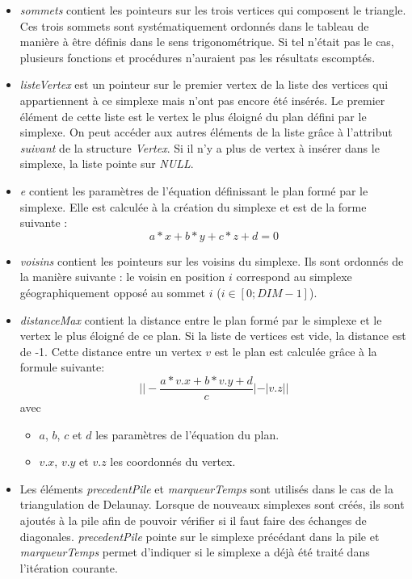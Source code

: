\documentclass{article}
\begin{document}
    \begin{itemize}
    \item \textit{sommets} contient les pointeurs sur les trois vertices qui composent le triangle. Ces trois sommets sont systématiquement ordonnés dans le tableau de manière à être définis dans le sens trigonométrique. Si tel n'était pas le cas, plusieurs fonctions et procédures n'auraient pas les résultats escomptés.
    \item \textit{listeVertex} est un pointeur sur le premier vertex de la liste des vertices qui appartiennent à ce simplexe mais n'ont pas encore été insérés. Le premier élément de cette liste est le vertex le plus éloigné du plan défini par le simplexe. On peut accéder aux autres éléments de la liste grâce à l'attribut \textit{suivant} de la structure \textit{Vertex}. Si il n'y a plus de vertex à insérer dans le simplexe, la liste pointe sur \textit{NULL}.
    \item \textit{e} contient les paramètres de l'équation définissant le plan formé par le simplexe. Elle est calculée à la création du simplexe et est de la forme suivante : \[a*x + b*y +c*z + d = 0\]
    \item \textit{voisins} contient les pointeurs sur les voisins du simplexe. Ils sont ordonnés de la manière suivante : le voisin en position $i$ correspond au simplexe géographiquement opposé au sommet $i$ ($i \in [0; \textit{DIM}-1]$).
    \item \textit{distanceMax} contient la distance entre le plan formé par le simplexe et le vertex le plus éloigné de ce plan. Si la liste de vertices est vide, la distance est de -1. Cette distance entre un vertex $v$ est le plan est calculée grâce à la formule suivante: \[| |-\frac{a * v.x + b*v.y + d}{c}| - |v.z| | \] avec 
    \begin{itemize}
    \item $a$, $b$, $c$ et $d$ les paramètres de l'équation du plan.
    \item $v.x$, $v.y$ et $v.z$ les coordonnés du vertex.
    \end{itemize}
    \item Les éléments \textit{precedentPile} et \textit{marqueurTemps} sont utilisés dans le cas de la triangulation de Delaunay. Lorsque de nouveaux simplexes sont créés, ils sont ajoutés à la pile afin de pouvoir vérifier si il faut faire des échanges de diagonales. \textit{precedentPile} pointe sur le simplexe précédant dans la pile et \textit{marqueurTemps} permet d'indiquer si le simplexe a déjà été traité dans l'itération courante.
    \end{itemize}
\end{document}
